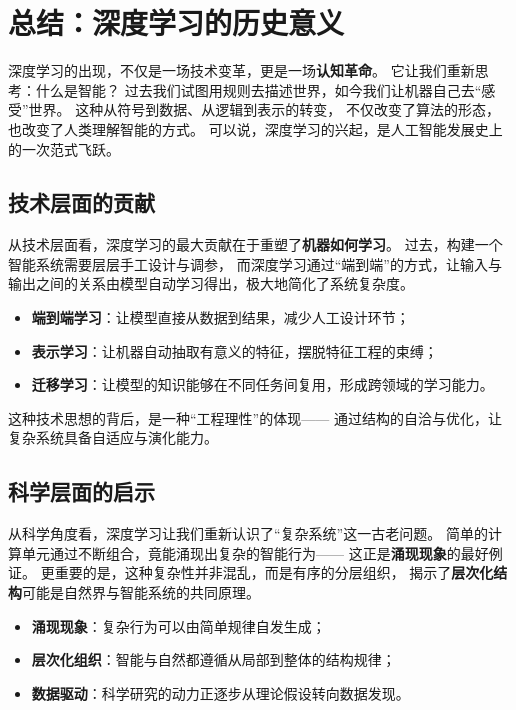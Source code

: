 \section{总结：深度学习的历史意义}

深度学习的出现，不仅是一场技术变革，更是一场\textbf{认知革命}。  
它让我们重新思考：什么是智能？  
过去我们试图用规则去描述世界，如今我们让机器自己去“感受”世界。  
这种从符号到数据、从逻辑到表示的转变，  
不仅改变了算法的形态，也改变了人类理解智能的方式。  
可以说，深度学习的兴起，是人工智能发展史上的一次范式飞跃。

\subsection{技术层面的贡献}

从技术层面看，深度学习的最大贡献在于重塑了\textbf{机器如何学习}。  
过去，构建一个智能系统需要层层手工设计与调参，  
而深度学习通过“端到端”的方式，让输入与输出之间的关系由模型自动学习得出，极大地简化了系统复杂度。  

\begin{itemize}
\item \textbf{端到端学习}：让模型直接从数据到结果，减少人工设计环节；
\item \textbf{表示学习}：让机器自动抽取有意义的特征，摆脱特征工程的束缚；
\item \textbf{迁移学习}：让模型的知识能够在不同任务间复用，形成跨领域的学习能力。
\end{itemize}

这种技术思想的背后，是一种“工程理性”的体现——  
通过结构的自洽与优化，让复杂系统具备自适应与演化能力。

\subsection{科学层面的启示}

从科学角度看，深度学习让我们重新认识了“复杂系统”这一古老问题。  
简单的计算单元通过不断组合，竟能涌现出复杂的智能行为——  
这正是\textbf{涌现现象}的最好例证。  
更重要的是，这种复杂性并非混乱，而是有序的分层组织，  
揭示了\textbf{层次化结构}可能是自然界与智能系统的共同原理。  

\begin{itemize}
\item \textbf{涌现现象}：复杂行为可以由简单规律自发生成；
\item \textbf{层次化组织}：智能与自然都遵循从局部到整体的结构规律；
\item \textbf{数据驱动}：科学研究的动力正逐步从理论假设转向数据发现。
\end{itemize}

